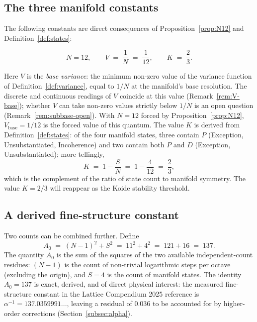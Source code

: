 \documentclass[11pt,a4paper]{article}
\theoremstyle{definition}
\theoremstyle{remark}
\begin{document}
\subsection{The three manifold constants}\label{subsec:constants}

The following constants are direct consequences of Proposition~\ref{prop:N12} and Definition~\ref{def:states}:

\begin{equation}\label{eq:constants}
\boxed{\;N = 12, \qquad V \;=\; \frac{1}{N} \;=\; \frac{1}{12}, \qquad K \;=\; \frac{2}{3}.\;}
\end{equation}

Here $V$ is the \emph{base variance}: the minimum non-zero value of the variance function of Definition~\ref{def:variance}, equal to $1/N$ at the manifold's base resolution. The discrete and continuous readings of $V$ coincide at this value (Remark~\ref{rem:V-base}); whether $V$ can take non-zero values strictly below $1/N$ is an open question (Remark~\ref{rem:subbase-open}). With $N=12$ forced by Proposition~\ref{prop:N12}, $V_{\text{base}} = 1/12$ is the forced value of this quantum. The value $K$ is derived from Definition~\ref{def:states}: of the four manifold states, three contain $P$ (Exception, Unsubstantiated, Incoherence) and two contain both $P$ and $D$ (Exception, Unsubstantiated); more tellingly,
\[
K \;=\; 1 - \frac{S}{N} \;=\; 1 - \frac{4}{12} \;=\; \frac{2}{3},
\]
which is the complement of the ratio of state count to manifold symmetry. The value $K=2/3$ will reappear as the Koide stability threshold.

\subsection{A derived fine-structure constant}

Two counts can be combined further. Define
\begin{equation}\label{eq:A0}
A_{0} \;=\; (N-1)^{2} + S^{2} \;=\; 11^{2} + 4^{2} \;=\; 121 + 16 \;=\; 137.
\end{equation}
The quantity $A_{0}$ is the sum of the squares of the two available independent-count residues: $(N-1)$ is the count of non-trivial logarithmic steps per octave (excluding the origin), and $S=4$ is the count of manifold states. The identity $A_{0}=137$ is exact, derived, and of direct physical interest: the measured fine-structure constant in the Lattice Compendium 2025 reference is $\alpha^{-1}=137.0359991...$, leaving a residual of $0.036$ to be accounted for by higher-order corrections (Section~\ref{subsec:alpha}).
\end{document}
